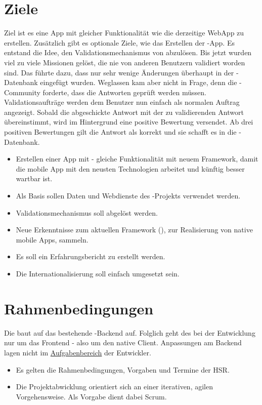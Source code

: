 \section{Ziele}
\label{tb-einfuehrung-ziele}
Ziel ist es eine  App mit gleicher Funktionalität wie die derzeitige \gls{WebApp} zu erstellen.
Zusätzlich gibt es optionale Ziele, wie das Erstellen der -App.
Es entstand die Idee, den Validationsmechanismus von \kort{} abzulösen.
Bis jetzt wurden viel zu viele Missionen gelöst, die nie von anderen Benutzern validiert worden sind.
Das führte dazu, dass nur sehr wenige Änderungen überhaupt in der -Datenbank eingefügt wurden.
Weglassen kam aber nicht in Frage, denn die -Community forderte, dass die Antworten geprüft werden müssen.
Validationsaufträge werden dem Benutzer nun einfach als normalen Auftrag angezeigt.
Sobald die abgeschickte Antwort mit der zu validierenden Antwort übereinstimmt, wird im Hintergrund eine positive Bewertung versendet.
Ab drei positiven Bewertungen gilt die Antwort als korrekt und sie schafft es in die -Datenbank.

\begin{itemize}
	\item Erstellen einer  App mit  - gleiche Funktionalität mit neuem Framework, damit die mobile App mit den neusten Technologien arbeitet und künftig besser wartbar ist.
	\item Als Basis sollen Daten und Webdienste des -Projekts verwendet werden.
	\item Validationsmechanismus soll abgelöst werden.
	\item Neue Erkenntnisse zum aktuellen Framework (), zur Realisierung von native mobile Apps, sammeln.
	\item Es soll ein Erfahrungsbericht zu  erstellt werden.
	\item Die Internationalisierung soll einfach umgesetzt sein.
\end{itemize}

\section{Rahmenbedingungen}
Die  baut auf das bestehende \kort{}-Backend auf.
Folglich geht des bei der Entwicklung nur um das Frontend - also um den native Client.
Anpassungen am Backend lagen nicht im \hyperref[pd-anforderungsspezifikation]{Aufgabenbereich} der Entwickler.
\begin{itemize}
	\item Es gelten die Rahmenbedingungen, Vorgaben und Termine der HSR.
	\item Die Projektabwicklung orientiert sich an einer iterativen, agilen Vorgehensweise. 
	Als Vorgabe dient dabei Scrum.
\end{itemize}

